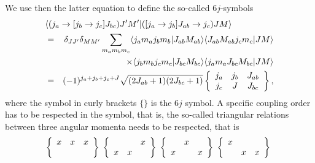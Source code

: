 We use then the latter equation to define the so-called $6j$-symbols
\begin{eqnarray}
\nonumber
\lefteqn{ \langle (j_a\rightarrow [j_b\rightarrow j_c]J_{bc}) J'M'| ([j_a\rightarrow j_b]J_{ab}\rightarrow j_c) JM\rangle } \\ \nonumber
&= & \delta_{JJ'}\delta_{MM'}\sum_{m_am_bm_c}\langle j_am_aj_bm_b|J_{ab}M_{ab}\rangle \langle J_{ab}M_{ab}j_cm_c|JM\rangle \\ \nonumber
& &  \times \langle j_bm_bj_cm_c|J_{bc}M_{bc}\rangle \langle j_am_aJ_{bc}M_{bc}|JM\rangle  \\ \nonumber
&= & (-1)^{j_a+j_b+j_c+J}\sqrt{(2J_{ab}+1)(2J_{bc}+1)}\left\{\begin{array}{ccc} j_a & j_b& J_{ab} \\ j_c & J & J_{bc} \end{array}\right\}
, \nonumber
\end{eqnarray}
where the symbol in curly brackets $\{\}$ is the $6j$ symbol. 
A specific coupling order has to be respected in the symbol, that is, the so-called triangular relations between three angular momenta needs to be respected, that is 
\[
\left\{\begin{array}{ccc} x & x& x \\  &  &  \end{array}\right\}\hspace{0.1cm}\left\{\begin{array}{ccc}  & & x \\  x& x &  \end{array}\right\}\hspace{0.1cm}\left\{\begin{array}{ccc}  & x&  \\ x &  &x  \end{array}\right\}\hspace{0.1cm}\left\{\begin{array}{ccc} x & &  \\  & x &x  \end{array}\right\}\hspace{0.1cm}
\]


